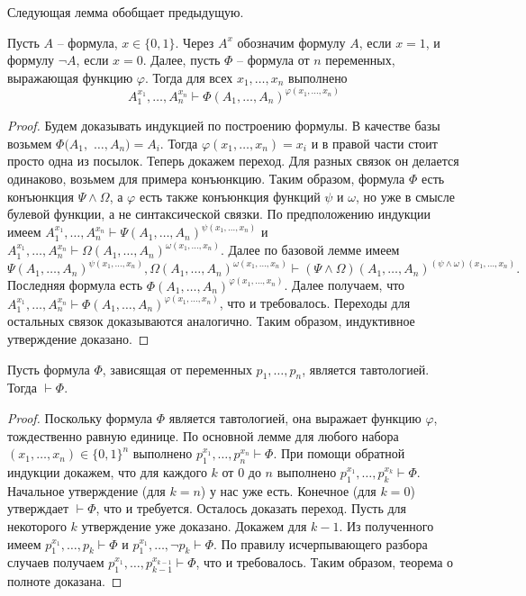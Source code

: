 Следующая лемма обобщает предыдущую.
\begin{lemma}[Основная]
  Пусть $A$ -- формула, $x \in \{0,1\}$. Через $A^x$ обозначим формулу $A$, если $x=1$, и формулу $\neg A$, если $x=0$. Далее, пусть $\Phi$ -- формула от $n$ переменных, выражающая функцию $\varphi$. Тогда для всех $x_1, \dots, x_n$ выполнено
  \[
    A_1^{x_1}, \dots, A_n^{x_n} \vdash \Phi(A_1, \dots, A_n)^{\varphi(x_1, \dots, x_n)}
  \]
  \begin{proof}
    Будем доказывать индукцией по построению формулы. В качестве базы возьмем $\Phi(A_1,$ $\dots, A_n) = A_i$. Тогда $\varphi(x_1, \dots, x_n) = x_i$ и в правой части стоит просто одна из посылок. \newline
    Теперь докажем переход. Для разных связок он делается одинаково, возьмем для примера конъюнкцию. Таким образом, формула $\Phi$ есть конъюнкция $\Psi \wedge \Omega$, а $\varphi$ есть также конъюнкция функций $\psi$ и $\omega$, но уже в смысле булевой функции, а не синтаксической связки. По предположению индукции имеем $A_1^{x_1}, \dots, A_n^{x_n} \vdash \Psi(A_1, \dots, A_n)^{\psi(x_1, \dots, x_n)}$ и $A_1^{x_1}, \dots, A_n^{x_n} \vdash \Omega(A_1, \dots, A_n)^{\omega(x_1, \dots, x_n)}$. Далее по базовой лемме имеем
    \[
      \Psi(A_1, \dots, A_n)^{\psi(x_1, \dots, x_n)}, \Omega(A_1, \dots, A_n)^{\omega(x_1, \dots, x_n)} \vdash (\Psi \wedge \Omega)(A_1, \dots, A_n)^{(\psi \wedge \omega)(x_1, \dots, x_n)}.
    \]
    Последняя формула есть $\Phi(A_1, \dots, A_n)^{\varphi(x_1, \dots, x_n)}$. Далее получаем, что $A_1^{x_1}, \dots, A_n^{x_n} \vdash \Phi(A_1, \dots, A_n)^{\varphi(x_1, \dots, x_n)}$, что и требовалось. Переходы для остальных связок доказываются аналогично. Таким образом, индуктивное утверждение доказано.
  \end{proof}
\end{lemma}

\begin{theorem}
  Пусть формула $\Phi$, зависящая от переменных $p_1, \dots, p_n$, является тавтологией. Тогда $\vdash \Phi$.
  \begin{proof}
    Поскольку формула $\Phi$ является тавтологией, она выражает функцию $\varphi$, тождественно равную единице. По основной лемме для любого набора $(x_1, \dots, x_n) \in \{0,1\}^n$ выполнено $p_1^{x_1}, \dots, p_n^{x_n} \vdash \Phi$. При помощи обратной индукции докажем, что для каждого $k$ от $0$ до $n$ выполнено $p_1^{x_1}, \dots, p_k^{x_k} \vdash \Phi$. Начальное утверждение (для $k=n$) у нас уже есть. Конечное (для $k=0$) утверждает $\vdash \Phi$, что и требуется. Осталось доказать переход. \newline
    Пусть для некоторого $k$ утверждение уже доказано. Докажем для $k-1$. Из полученного имеем $p_1^{x_1}, \dots, p_k \vdash \Phi$ и $p_1^{x_1}, \dots, \neg p_k \vdash \Phi$. По правилу исчерпывающего разбора случаев получаем $p_1^{x_1}, \dots, p_{k-1}^{x_{k-1}} \vdash \Phi$, что и требовалось. Таким образом, теорема о полноте доказана.
  \end{proof}
\end{theorem}